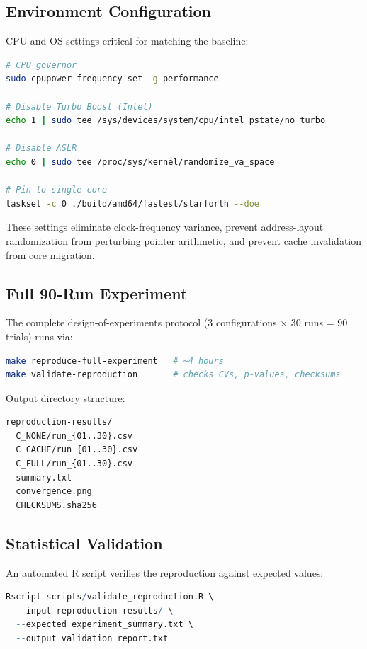 \subsection{Environment Configuration}

CPU and OS settings critical for matching the baseline:

\begin{lstlisting}[language=bash]
# CPU governor
sudo cpupower frequency-set -g performance

# Disable Turbo Boost (Intel)
echo 1 | sudo tee /sys/devices/system/cpu/intel_pstate/no_turbo

# Disable ASLR
echo 0 | sudo tee /proc/sys/kernel/randomize_va_space

# Pin to single core
taskset -c 0 ./build/amd64/fastest/starforth --doe
\end{lstlisting}

These settings eliminate clock-frequency variance, prevent address-layout
randomization from perturbing pointer arithmetic, and prevent cache
invalidation from core migration.

\subsection{Full 90-Run Experiment}

The complete design-of-experiments protocol (3 configurations $\times$ 30
runs = 90 trials) runs via:

\begin{lstlisting}[language=bash]
make reproduce-full-experiment   # ~4 hours
make validate-reproduction       # checks CVs, p-values, checksums
\end{lstlisting}

Output directory structure:
\begin{lstlisting}
reproduction-results/
  C_NONE/run_{01..30}.csv
  C_CACHE/run_{01..30}.csv
  C_FULL/run_{01..30}.csv
  summary.txt
  convergence.png
  CHECKSUMS.sha256
\end{lstlisting}

\subsection{Statistical Validation}

An automated R script verifies the reproduction against expected values:

\begin{lstlisting}[language=R]
Rscript scripts/validate_reproduction.R \
  --input reproduction-results/ \
  --expected experiment_summary.txt \
  --output validation_report.txt
\end{lstlisting}

